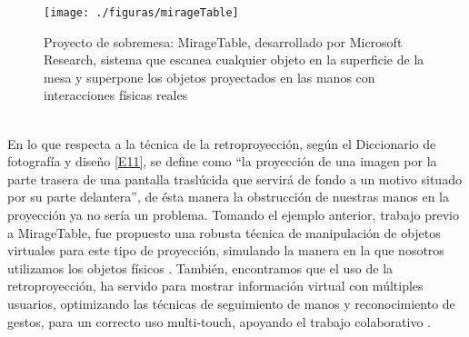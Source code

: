 \documentclass[a4paper,openright,12pt]{report}
\begin{document}
\begin{figure}[th]
	\centering
	\texttt{[image: ./figuras/mirageTable]}
	\caption[Proyecto de sobremesa: MirageTable]{Proyecto de sobremesa: MirageTable, desarrollado por Microsoft Research\textregistered, sistema que escanea cualquier objeto en la superficie de la mesa y superpone los objetos proyectados en las manos con interacciones físicas reales \citep{benko2012}} \label{fig:mirageTable}
\end{figure}\\
En lo que respecta a la técnica de la retroproyección, según el Diccionario de fotografía y diseño \hyperlink{e11}{[E11]}, se define como ``la proyección de una imagen por la parte trasera de una pantalla traslúcida que servirá de fondo a un motivo situado por su parte delantera'', de ésta manera la obstrucción de nuestras manos en la proyección ya no sería un problema. Tomando el ejemplo anterior, trabajo previo a MirageTable, fue propuesto una robusta técnica de manipulación de objetos virtuales para este tipo de proyección, simulando la manera en la que nosotros utilizamos los objetos físicos \citep{hilliges2009}. También, encontramos que el uso de la retroproyección, ha servido para mostrar información virtual con múltiples usuarios, optimizando las técnicas de seguimiento de manos y reconocimiento de gestos, para un correcto uso multi-touch, apoyando el trabajo colaborativo \citep{geller2006,dohse2008}.
\end{document}
